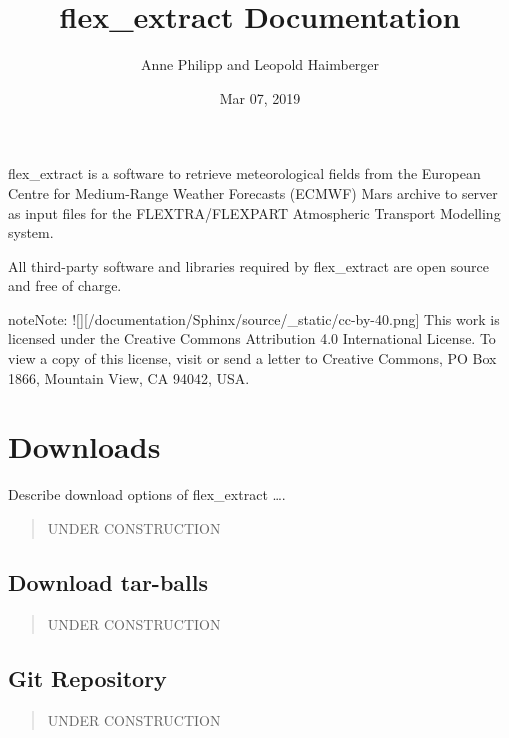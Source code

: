 \documentclass[letterpaper,10pt,english]{sphinxmanual}
\title{flex\_extract Documentation}
\date{Mar 07, 2019}
\author{Anne Philipp and Leopold Haimberger}
\begin{document}
\pagestyle{empty}
\sphinxmaketitle
\pagestyle{plain}
\sphinxtableofcontents
\pagestyle{normal}
\label{\detokenize{index::doc}}


flex\_extract is a software to retrieve meteorological fields from the European Centre for Medium-Range Weather Forecasts (ECMWF) Mars archive to server as input files for the FLEXTRA/FLEXPART Atmospheric Transport Modelling system.

All third-party software and libraries required by flex\_extract are open source and free of charge.



\begin{sphinxadmonition}{note}{Note:}
!{[}{]}{[}/documentation/Sphinx/source/\_static/cc-by-40.png{]}
This work is licensed under the Creative Commons Attribution 4.0
International License. To view a copy of this license, visit
 or send a letter to
Creative Commons, PO Box 1866, Mountain View, CA 94042, USA.
\end{sphinxadmonition}


\chapter{Downloads}
\label{\detokenize{downloads:downloads}}\label{\detokenize{downloads::doc}}
Describe download options of flex\_extract ….
\begin{quote}

UNDER CONSTRUCTION
\end{quote}


\section{Download tar-balls}
\label{\detokenize{downloads/tar_balls:download-tar-balls}}\label{\detokenize{downloads/tar_balls::doc}}\begin{quote}

UNDER CONSTRUCTION
\end{quote}


\section{Git Repository}
\label{\detokenize{downloads/git_repo:git-repository}}\label{\detokenize{downloads/git_repo::doc}}\begin{quote}

UNDER CONSTRUCTION
\end{quote}
\end{document}
